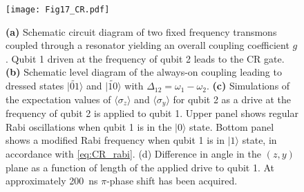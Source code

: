 \documentclass[aip,apr,twocolumn,showpacs,superscriptaddress,groupedaddress,nofootinbib,reprint]{revtex4-1}  %
\newcommand{\CR}{\textsf{CR}}
\begin{document}
\begin{figure}[!ht]
\begin{center}
\texttt{[image: Fig17\_CR.pdf]}
\caption{\textbf{(a)} Schematic circuit diagram of two fixed frequency transmons coupled through a resonator yielding an overall coupling coefficient $g$. Qubit 1 driven at the frequency of qubit 2 leads to the \CR{} gate. \textbf{(b)} Schematic level diagram of the always-on coupling leading to dressed states $|\widetilde{01}\rangle$ and $|\widetilde{10}\rangle$ with $\Delta_{12} = \omega_1 - \omega_2$. \textbf{(c)} Simulations of the expectation values of $\langle \sigma_z\rangle$ and $\langle \sigma_y \rangle$ for qubit 2 as a drive at the frequency of qubit 2 is applied to qubit 1. Upper panel shows regular Rabi oscillations when qubit 1 is in the $|0\rangle$ state. Bottom panel shows a modified Rabi frequency when qubit 1 is in $|1\rangle$ state, in accordance with \cref{eq:CR_rabi}. (d) Difference in angle in the $(z,y)$ plane as a function of length of the applied drive to qubit 1. At approximately 200~ns $\pi$-phase shift has been acquired.}
\label{fig:2qb_CR}
\end{center}
\end{figure}
\end{document}
